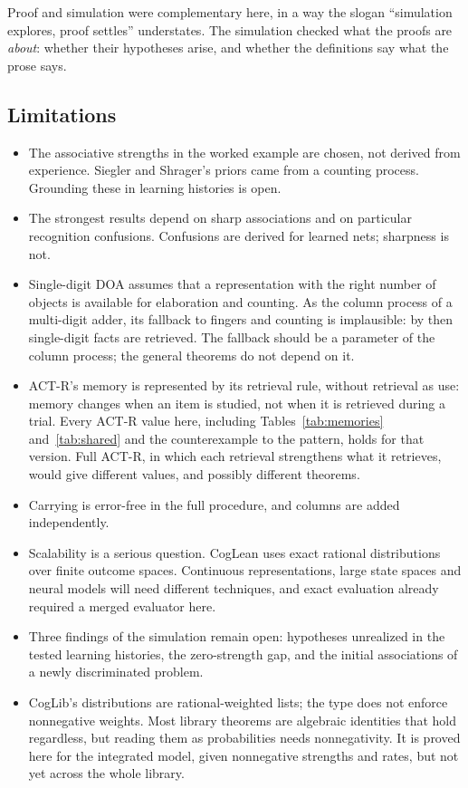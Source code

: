 \documentclass[11pt]{article}
\begin{document}
Proof and simulation were complementary here, in a way the slogan ``simulation explores, proof settles'' understates. The simulation checked what the proofs are \emph{about}: whether their hypotheses arise, and whether the definitions say what the prose says.

\subsection{Limitations}

\begin{itemize}
  \item The associative strengths in the worked example are chosen, not derived from experience. Siegler and Shrager's priors came from a counting process. Grounding these in learning histories is open.
  \item The strongest results depend on sharp associations and on particular recognition confusions. Confusions are derived for learned nets; sharpness is not.
  \item Single-digit DOA assumes that a representation with the right number of objects is available for elaboration and counting. As the column process of a multi-digit adder, its fallback to fingers and counting is implausible: by then single-digit facts are retrieved. The fallback should be a parameter of the column process; the general theorems do not depend on it.
  \item ACT-R's memory is represented by its retrieval rule, without retrieval as use: memory changes when an item is studied, not when it is retrieved during a trial. Every ACT-R value here, including Tables~\ref{tab:memories} and~\ref{tab:shared} and the counterexample to the pattern, holds for that version. Full ACT-R, in which each retrieval strengthens what it retrieves, would give different values, and possibly different theorems.
  \item Carrying is error-free in the full procedure, and columns are added independently.
  \item Scalability is a serious question. CogLean uses exact rational distributions over finite outcome spaces. Continuous representations, large state spaces and neural models will need different techniques, and exact evaluation already required a merged evaluator here.
  \item Three findings of the simulation remain open: hypotheses unrealized in the tested learning histories, the zero-strength gap, and the initial associations of a newly discriminated problem.
  \item CogLib's distributions are rational-weighted lists; the type does not enforce nonnegative weights. Most library theorems are algebraic identities that hold regardless, but reading them as probabilities needs nonnegativity. It is proved here for the integrated model, given nonnegative strengths and rates, but not yet across the whole library.
\end{itemize}
\end{document}
